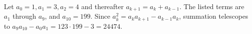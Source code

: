 Let $ a_0=1,a_1=3,a_2=4 $ and thereafter $ a_{k+1}=a_k+a_{k-1}$. The listed terms are $ a_1 $ through $ a_9 $, and $ a_{10}=199 $. Since $ a_k^2=a_ka_{k+1}-a_{k-1}a_k $, summation telescopes to $ a_9a_{10}-a_0a_1=123\cdot199-3=\boxed{24474}$.
